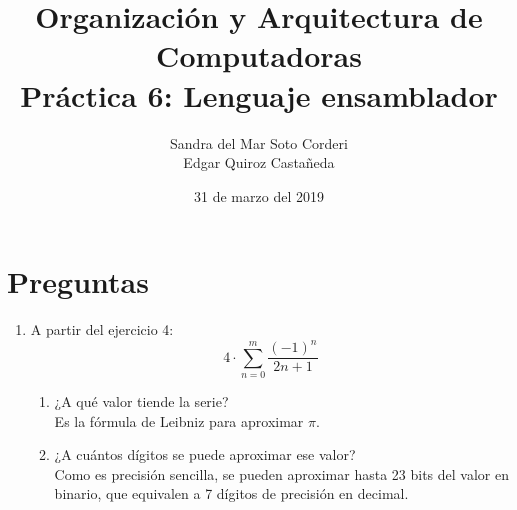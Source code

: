 \documentclass{article}
\begin{document}
    \title{
        Organización y Arquitectura de Computadoras \\
        Práctica 6: Lenguaje ensamblador \\
    }
    \date{
        31 de marzo del 2019
    }
    \author{
        Sandra del Mar Soto Corderi \\
        Edgar Quiroz Castañeda
    }
    \maketitle

    \section{Preguntas}
    \begin{enumerate}
        \item {
        	A partir del ejercicio 4:
            \[4\cdot\sum_{n=0}^{m}{\frac{(-1)^{n}}{2n+1}}\]
            \begin{enumerate}
                \item ¿A qué valor tiende la serie?\\
                Es la fórmula de Leibniz\cite{wolfram pi} para aproximar $\pi$.\\
                
                \item ¿A cuántos dígitos se puede aproximar ese valor?\\
                Como es precisión sencilla, se pueden aproximar hasta 23 bits
                del valor en binario, que equivalen a 7 dígitos de precisión en
                decimal\cite{ieee flot32 std}.\\
                

\end{enumerate}}
\end{enumerate}
\end{document}
